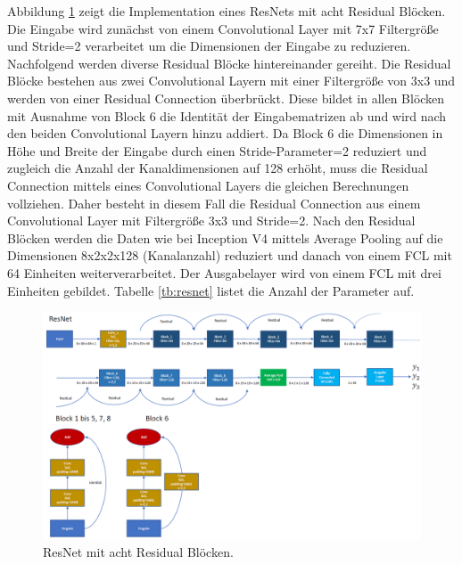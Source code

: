 Abbildung \ref{fig:resnet} zeigt die Implementation eines ResNets mit acht Residual Blöcken. Die Eingabe wird zunächst von einem Convolutional Layer mit 7x7 Filtergröße und Stride=2 verarbeitet um die Dimensionen der Eingabe zu reduzieren. Nachfolgend werden diverse Residual Blöcke hintereinander gereiht. Die Residual Blöcke bestehen aus zwei Convolutional Layern mit einer Filtergröße von 3x3 und werden von einer Residual Connection überbrückt. Diese bildet in allen Blöcken mit Ausnahme von Block 6 die Identität der Eingabematrizen ab und wird nach den beiden Convolutional Layern hinzu addiert. Da Block 6 die Dimensionen in Höhe und Breite der Eingabe durch einen Stride-Parameter=2 reduziert und zugleich die Anzahl der Kanaldimensionen auf 128 erhöht, muss die Residual Connection mittels eines Convolutional Layers die gleichen Berechnungen vollziehen. Daher besteht in diesem Fall die Residual Connection aus einem Convolutional Layer mit Filtergröße 3x3 und Stride=2. Nach den Residual Blöcken werden die Daten wie bei Inception V4 mittels Average Pooling auf die Dimensionen 8x2x2x128 (Kanalanzahl) reduziert und danach von einem FCL mit 64 Einheiten weiterverarbeitet. Der Ausgabelayer wird von einem FCL mit drei Einheiten gebildet. Tabelle \ref{tb:resnet} listet die Anzahl der Parameter auf.
\newpage
\begin{figure}[H]
\thispagestyle{empty}
\centering
\includegraphics[angle=90, scale=0.6]{pictures/Inception/ResNet}
\caption[Caption for LOF]{ResNet mit acht Residual Blöcken.}
\label{fig:resnet}
\end{figure}


